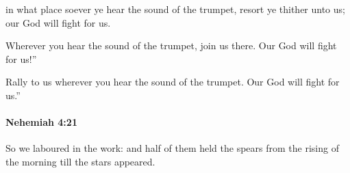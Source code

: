 			\begin{versebox}
					\item[BHS] 
					\item[LXX] 
					\item[ASV] in what place soever ye hear the sound of the trumpet, resort ye thither unto us; our God will fight for us.
					\item[NIV] Wherever you hear the sound of the trumpet, join us there. Our God will fight for us!”
					\item[NRSV] Rally to us wherever you hear the sound of the trumpet. Our God will fight for us.”
			\end{versebox}

		\paragraph{Nehemiah 4:21} %
			\label{NEHEMIAH-4-21}

			So we laboured in the work: and half of them held the spears from the rising of the morning till the stars appeared.

